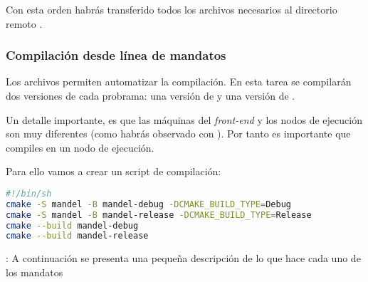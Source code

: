 Con esta orden habrás transferido todos los archivos necesarios al directorio
remoto .

\subsubsection{Compilación desde línea de mandatos}

Los archivos  permiten automatizar la compilación. En esta tarea
se compilarán dos versiones de cada probrama: una versión de 
y una versión de .

Un detalle importante, es que las máquinas del \emph{front-end} y los nodos de
ejecución son muy diferentes (como habrás observado con ). Por
tanto es importante que compiles en un nodo de ejecución.

Para ello vamos a crear un script de compilación:
\begin{lstlisting}[language=bash,frame=single,title={Archivo: runlscpu.sh}]
#!/bin/sh
cmake -S mandel -B mandel-debug -DCMAKE_BUILD_TYPE=Debug
cmake -S mandel -B mandel-release -DCMAKE_BUILD_TYPE=Release
cmake --build mandel-debug
cmake --build mandel-release 
\end{lstlisting}

: A continuación se presenta una pequeña descripción
de lo que hace cada uno de los mandatos

